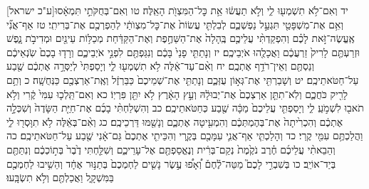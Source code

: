 \documentclass[twoside, openany, parskip=half, 11pt]{book}
\begin{document}
[ע"כ ישראל]יד וְאִם־לֹ֥א תִשְׁמְע֖וּ לִ֑י וְלֹ֣א תַעֲשׂ֔וּ אֵ֥ת כׇּל־הַמִּצְוֺ֖ת הָאֵֽלֶּה׃ טו וְאִם־בְּחֻקֹּתַ֣י תִּמְאָ֔סוּ וְאִ֥ם אֶת־מִשְׁפָּטַ֖י תִּגְעַ֣ל נַפְשְׁכֶ֑ם לְבִלְתִּ֤י עֲשׂוֹת֙ אֶת־כׇּל־מִצְוֺתַ֔י לְהַפְרְכֶ֖ם אֶת־בְּרִיתִֽי׃ טז אַף־אֲנִ֞י אֶֽעֱשֶׂה־זֹּ֣את לָכֶ֗ם וְהִפְקַדְתִּ֨י עֲלֵיכֶ֤ם בֶּֽהָלָה֙ אֶת־הַשַּׁחֶ֣פֶת וְאֶת־הַקַּדַּ֔חַת מְכַלּ֥וֹת עֵינַ֖יִם וּמְדִיבֹ֣ת נָ֑פֶשׁ וּזְרַעְתֶּ֤ם לָרִיק֙ זַרְעֲכֶ֔ם וַאֲכָלֻ֖הוּ אֹיְבֵיכֶֽם׃ יז וְנָתַתִּ֤י פָנַי֙ בָּכֶ֔ם וְנִגַּפְתֶּ֖ם לִפְנֵ֣י אֹיְבֵיכֶ֑ם וְרָד֤וּ בָכֶם֙ שֹֽׂנְאֵיכֶ֔ם וְנַסְתֶּ֖ם וְאֵין־רֹדֵ֥ף אֶתְכֶֽם׃ יח וְאִ֨ם־עַד־אֵ֔לֶּה לֹ֥א תִשְׁמְע֖וּ לִ֑י וְיָסַפְתִּי֙ לְיַסְּרָ֣ה אֶתְכֶ֔ם שֶׁ֖בַע עַל־חַטֹּאתֵיכֶֽם׃ יט וְשָׁבַרְתִּ֖י אֶת־גְּא֣וֹן עֻזְּכֶ֑ם וְנָתַתִּ֤י אֶת־שְׁמֵיכֶם֙ כַּבַּרְזֶ֔ל וְאֶֽת־אַרְצְכֶ֖ם כַּנְּחֻשָֽׁה׃ כ וְתַ֥ם לָרִ֖יק כֹּחֲכֶ֑ם וְלֹֽא־תִתֵּ֤ן אַרְצְכֶם֙ אֶת־יְבוּלָ֔הּ וְעֵ֣ץ הָאָ֔רֶץ לֹ֥א יִתֵּ֖ן פִּרְיֽוֹ׃ כא וְאִם־תֵּֽלְכ֤וּ עִמִּי֙ קֶ֔רִי וְלֹ֥א תֹאב֖וּ לִשְׁמֹ֣עַֽ לִ֑י וְיָסַפְתִּ֤י עֲלֵיכֶם֙ מַכָּ֔ה שֶׁ֖בַע כְּחַטֹּאתֵיכֶֽם׃ כב וְהִשְׁלַחְתִּ֨י בָכֶ֜ם אֶת־חַיַּ֤ת הַשָּׂדֶה֙ וְשִׁכְּלָ֣ה אֶתְכֶ֔ם וְהִכְרִ֙יתָה֙ אֶת־בְּהֶמְתְּכֶ֔ם וְהִמְעִ֖יטָה אֶתְכֶ֑ם וְנָשַׁ֖מּוּ דַּרְכֵיכֶֽם׃ כג וְאִ֨ם־בְּאֵ֔לֶּה לֹ֥א תִוָּסְר֖וּ לִ֑י וַהֲלַכְתֶּ֥ם עִמִּ֖י קֶֽרִי׃ כד וְהָלַכְתִּ֧י אַף־אֲנִ֛י עִמָּכֶ֖ם בְּקֶ֑רִי וְהִכֵּיתִ֤י אֶתְכֶם֙ גַּם־אָ֔נִי שֶׁ֖בַע עַל־חַטֹּאתֵיכֶֽם׃ כה וְהֵבֵאתִ֨י עֲלֵיכֶ֜ם חֶ֗רֶב נֹקֶ֙מֶת֙ נְקַם־בְּרִ֔ית וְנֶאֱסַפְתֶּ֖ם אֶל־עָרֵיכֶ֑ם וְשִׁלַּ֤חְתִּי דֶ֙בֶר֙ בְּת֣וֹכְכֶ֔ם וְנִתַּתֶּ֖ם בְּיַד־אוֹיֵֽב׃ כו בְּשִׁבְרִ֣י לָכֶם֮ מַטֵּה־לֶ֒חֶם֒ וְ֠אָפ֠וּ עֶ֣שֶׂר נָשִׁ֤ים לַחְמְכֶם֙ בְּתַנּ֣וּר אֶחָ֔ד וְהֵשִׁ֥יבוּ לַחְמְכֶ֖ם בַּמִּשְׁקָ֑ל וַאֲכַלְתֶּ֖ם וְלֹ֥א תִשְׂבָּֽעוּ׃
\end{document}
